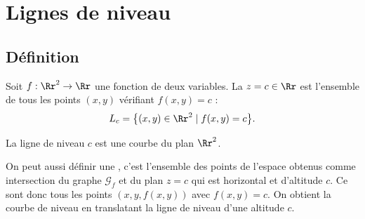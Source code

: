 \documentclass[11pt,class=report,crop=false]{standalone}
\begin{document}
\section{Lignes de niveau}


\subsection{Définition}

\begin{definition}
Soit $f : \Rr^2 \to \Rr$ une fonction de deux variables. 
La  $z=c\in \Rr$ est l'ensemble de tous les points $(x,y)$ vérifiant $f(x,y)=c$ :
$$L_c =\big\{(x,y)\in \Rr^2 \mid f(x,y)=c \big\}.$$
\end{definition}

La ligne de niveau $c$ est une courbe du plan $\Rr^2$. 

On peut aussi définir une , c'est l'ensemble des points de l'espace obtenus comme intersection du graphe $\mathcal{G}_f$ et du plan $z=c$ qui est horizontal et \og{}d'altitude\fg{} $c$. Ce sont donc tous les points $(x,y,f(x,y))$ avec $f(x,y)=c$. On obtient la courbe de niveau en translatant la ligne de niveau d'une altitude $c$.
\end{document}
